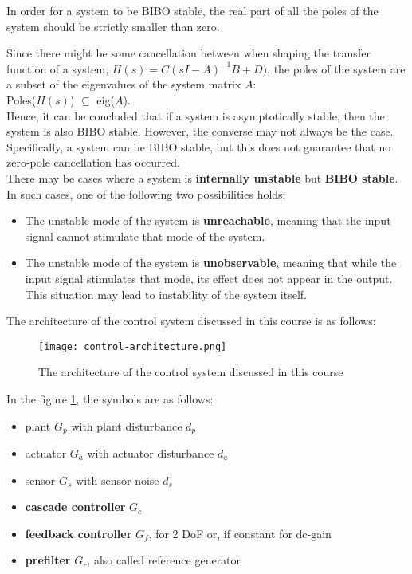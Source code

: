 In order for a system to be BIBO stable, the real part of all the poles of the system should be strictly smaller than zero.


\begin{QandAbox}
Since there might be some cancellation between when shaping the transfer function of a system, \(H(s) = C(sI-A)^{-1}B + D)\), the poles of the system are a subset of the eigenvalues of the system matrix \(A\):\\

Poles(\(H(s)\)) \(\subseteq\) eig(\(A\)).\\

Hence, it can be concluded that if a system is asymptotically stable, then the system is also BIBO stable. However, the converse may not always be the case. Specifically, a system can be BIBO stable, but this does not guarantee that no zero-pole cancellation has occurred.\\

There may be cases where a system is \textbf{internally unstable} but \textbf{BIBO stable}. In such cases, one of the following two possibilities holds:

\end{QandAbox}
\begin{QandAbox}

\begin{itemize}
   \item The unstable mode of the system is \textbf{unreachable}, meaning that the input signal cannot stimulate that mode of the system.
   \item The unstable mode of the system is \textbf{unobservable}, meaning that while the input signal stimulates that mode, its effect does not appear in the output. This situation may lead to instability of the system itself.
\end{itemize}
\end{QandAbox}

The architecture of the control system discussed in this course is as follows:

\begin{figure}[H]
    \centering
    \texttt{[image: control-architecture.png]}
    \caption{The architecture of the control system discussed in this course}
    \label{fig:control-architecture}
\end{figure}
In the figure \ref{fig:control-architecture}, the symbols are as follows:
\begin{itemize}
    \item plant \(G_p\) with plant disturbance \(d_p\) 
    \item actuator \(G_a\) with actuator disturbance \(d_a\)
    \item sensor \(G_s\) with sensor noise \(d_s\)
    \item \textbf{cascade controller} \(G_c\)
    \item \textbf{feedback controller} \(G_f\), for 2 DoF or, if constant for dc-gain
    \item \textbf{prefilter} \(G_r\), also called reference generator
\end{itemize}

